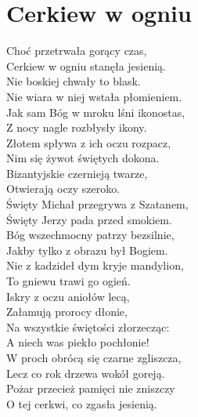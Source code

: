\section{Cerkiew w ogniu}
\noindent %
\begin{minipage}[t]{\dimexpr.4\textwidth-.4\columnsep}
    Choć przetrwała gorący czas,\\
    Cerkiew w ogniu stanęła jesienią.\\
    Nie boskiej chwały to blask.\\
    Nie wiara w niej wstała płomieniem.\\
    \hfill\break
    Jak sam Bóg w mroku lśni ikonostas,\\
    Z nocy nagle rozbłysły ikony.\\
    Złotem spływa z ich oczu rozpacz,\\
    Nim się żywot świętych dokona.\\
    \hfill\break
    Bizantyjskie czernieją twarze,\\
    Otwierają oczy szeroko.\\
    Święty Michał przegrywa z Szatanem,\\
    Święty Jerzy pada przed smokiem.\\
    \hfill\break
    Bóg wszechmocny patrzy bezsilnie,\\
    Jakby tylko z obrazu był Bogiem.\\
    Nie z kadzideł dym kryje mandylion,\\
    To gniewu trawi go ogień.\\
    \hfill\break
    Iskry z oczu aniołów lecą,\\
    Załamują prorocy dłonie,\\
    Na wszystkie świętości złorzecząc:\\
    A niech was piekło pochłonie!\\
    \hfill\break
    W proch obrócą się czarne zgliszcza,\\
    Lecz co rok drzewa wokół goreją.\\
    Pożar przecież pamięci nie zniszczy\\
    O tej cerkwi, co zgasła jesienią.\\
\end{minipage}
\hfill
\begin{minipage}[t]{\dimexpr.05\textwidth-.05\columnsep}
    \ifchorded %
    \hfill\break
    \hfill\break
    \else
    \fi
\end{minipage}